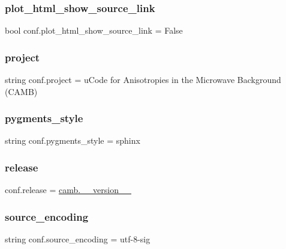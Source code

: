 \subsubsection{\texorpdfstring{plot\+\_\+html\+\_\+show\+\_\+source\+\_\+link}{plot\_html\_show\_source\_link}}
{\footnotesize\ttfamily bool conf.\+plot\+\_\+html\+\_\+show\+\_\+source\+\_\+link = False}

\mbox{\label{namespaceconf_aa2c6aefbed1597a70cfb45a760e5977c}} 
\subsubsection{\texorpdfstring{project}{project}}
{\footnotesize\ttfamily string conf.\+project = u\textquotesingle{}Code for Anisotropies in the Microwave Background (C\+A\+MB)\textquotesingle{}}

\mbox{\label{namespaceconf_afa4e4ed164119ef5f4656e9554ed1f1b}} 
\subsubsection{\texorpdfstring{pygments\+\_\+style}{pygments\_style}}
{\footnotesize\ttfamily string conf.\+pygments\+\_\+style = \textquotesingle{}sphinx\textquotesingle{}}

\mbox{\label{namespaceconf_aee93453546a31f4e76999ebaadf6e356}} 
\subsubsection{\texorpdfstring{release}{release}}
{\footnotesize\ttfamily conf.\+release = \mbox{\hyperlink{namespacecamb_a68e3f34837e39bb6f7e725612e4627fa}{camb.\+\_\+\+\_\+version\+\_\+\+\_\+}}}

\mbox{\label{namespaceconf_a0351dbdb53332ca016dc128fe3583e76}} 
\subsubsection{\texorpdfstring{source\+\_\+encoding}{source\_encoding}}
{\footnotesize\ttfamily string conf.\+source\+\_\+encoding = \textquotesingle{}utf-\/8-\/sig\textquotesingle{}}

